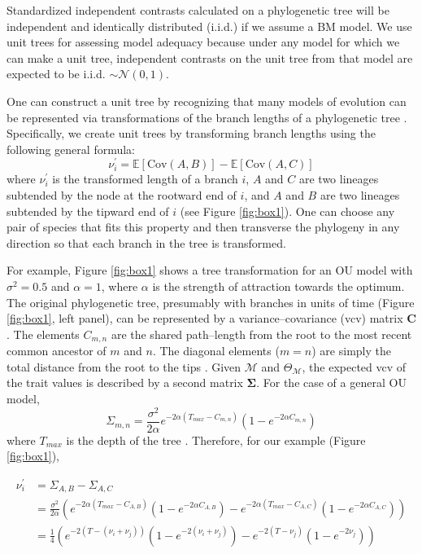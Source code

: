 \documentclass[a4paper,12pt]{article}
\begin{document}
Standardized independent contrasts calculated on a phylogenetic tree will be independent and identically distributed (i.i.d.) if we assume a BM model. We use unit trees for assessing model adequacy because under any model for which we can make a unit tree, independent contrasts on the unit tree from that model are expected to be i.i.d. $\sim \mathcal{N}(0,1)$.

One can construct a unit tree by recognizing that many models of evolution can be represented via transformations of the branch lengths of a phylogenetic tree \citep{Omeara2012, Ho2014}. Specifically, we create unit trees by transforming branch lengths using the following general formula:
\begin{equation}
\nu_i^\prime = \mathbb{E}[\mathrm{Cov}(A,B)] - \mathbb{E}[\mathrm{Cov}(A,C)]
\end{equation}
where $\nu_i^\prime$ is the transformed length of a branch $i$, $A$ and $C$ are two lineages subtended by the node at the rootward end of $i$, and $A$ and $B$ are two lineages subtended by the tipward end of $i$ (see Figure \ref{fig:box1}). One can choose any pair of species that fits this property and then transverse the phylogeny in any direction so that each branch in the tree is transformed. 

For example, Figure \ref{fig:box1} shows a tree transformation for an OU model with $\sigma^2=0.5$ and $\alpha = 1$, where $\alpha$ is the strength of attraction towards the optimum. The original phylogenetic tree, presumably with branches in units of time (Figure \ref{fig:box1}, left panel), can be represented by a variance--covariance (vcv) matrix $\mathbf{C}$. The elements $C_{m,n}$ are the shared path--length from the root to the most recent common ancestor of $m$ and $n$. The diagonal elements ($m = n$) are simply the total distance from the root to the tips \citep{Omeara2006}. Given $\mathcal{M}$ and $\Theta_{\mathcal{M}}$, the expected vcv of the trait values is described by a second matrix $\mathbf{\Sigma}$. For the case of a general OU model,
\begin{equation}
\Sigma_{m,n} = \frac{\sigma^2}{2\alpha} e^{-2\alpha (T_{max} - C_{m,n})} (1 - e^{-2\alpha C_{m,n}})
\end{equation} 
where $T_{max}$ is the depth of the tree \citep{Hansen1997, ButlerKing2004}. Therefore, for our example (Figure \ref{fig:box1}), 

\begin{align*}
  \nu_i^\prime &= \Sigma_{A,B} - \Sigma_{A,C}  \\ 
&= \frac{\sigma^2}{2\alpha} \left(e^{-2\alpha (T_{max} - C_{A,B})} (1 -e^{-2\alpha C_{A,B}})
- e^{-2 \alpha (T_{max} - C_{A,C})} (1 - e^{-2\alpha C_{A,C}}) \right)  \\
&= \frac{1}{4} \left( e^{-2 (T - (\nu_i + \nu_j))} (1 - e^{-2 (\nu_i + \nu_j)})
- e^{-2 (T - \nu_j)} (1 - e^{-2 \nu_j}) \right) 
\end{align*}
\end{document}
